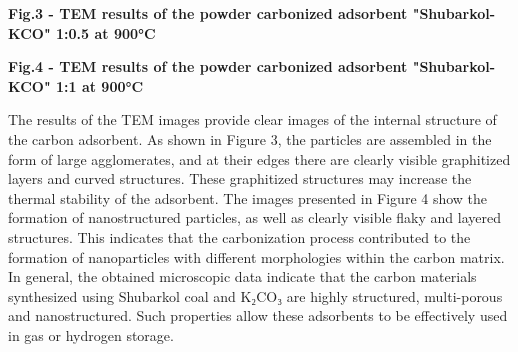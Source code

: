 {\bfseries Fig.3 - TEM results of the powder carbonized adsorbent
"Shubarkol-KCO" 1:0.5 at 900°C}


{\bfseries Fig.4 - TEM results of the powder carbonized adsorbent
"Shubarkol-KCO" 1:1 at 900°C}

The results of the TEM images provide clear images of the internal
structure of the carbon adsorbent. As shown in Figure 3, the particles
are assembled in the form of large agglomerates, and at their edges
there are clearly visible graphitized layers and curved structures.
These graphitized structures may increase the thermal stability of the
adsorbent. The images presented in Figure 4 show the formation of
nanostructured particles, as well as clearly visible flaky and layered
structures. This indicates that the carbonization process contributed to
the formation of nanoparticles with different morphologies within the
carbon matrix. In general, the obtained microscopic data indicate that
the carbon materials synthesized using Shubarkol coal and K₂CO₃ are
highly structured, multi-porous and nanostructured. Such properties
allow these adsorbents to be effectively used in gas or hydrogen
storage.


